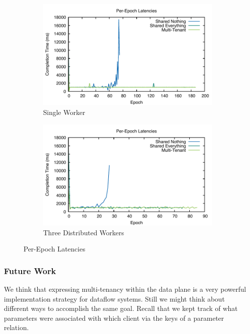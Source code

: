 \documentclass[../catalog.tex]{subfiles}
\begin{document}
\begin{figure}[h!]
  \begin{subfigure}{.5\textwidth}
    \includegraphics[width=1.0\linewidth]{results/multitenant_w1_p1/times}
    \caption{Single Worker}
  \end{subfigure}
  \begin{subfigure}{.5\textwidth}
    \includegraphics[width=1.0\linewidth]{results/multitenant_w1_p3/times}
    \caption{Three Distributed Workers}
  \end{subfigure}

  \caption{Per-Epoch Latencies}
\end{figure}

\subsubsection{Future Work}

We think that expressing multi-tenancy within the data plane is a very
powerful implementation strategy for dataflow systems. Still we might
think about different ways to accomplish the same goal. Recall that we
kept track of what parameters were associated with which client via
the keys of a parameter relation.
\end{document}
